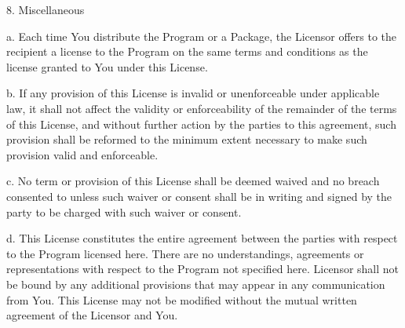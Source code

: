8. Miscellaneous

a.    Each time You distribute the Program or a Package, the Licensor offers to
the recipient a license to the Program on the same terms and conditions as the
license granted to You under this License.

b.    If any provision of this License is invalid or unenforceable under
applicable law, it shall not affect the validity or enforceability of the
remainder of the terms of this License, and without further action by the
parties to this agreement, such provision shall be reformed to the minimum
extent necessary to make such provision valid and enforceable.

c.    No term or provision of this License shall be deemed waived and no breach
consented to unless such waiver or consent shall be in writing and signed by the
party to be charged with such waiver or consent.

d.    This License constitutes the entire agreement between the parties with
respect to the Program licensed here. There are no understandings, agreements or
representations with respect to the Program not specified here. Licensor shall
not be bound by any additional provisions that may appear in any communication
from You. This License may not be modified without the mutual written agreement
of the Licensor and You.
